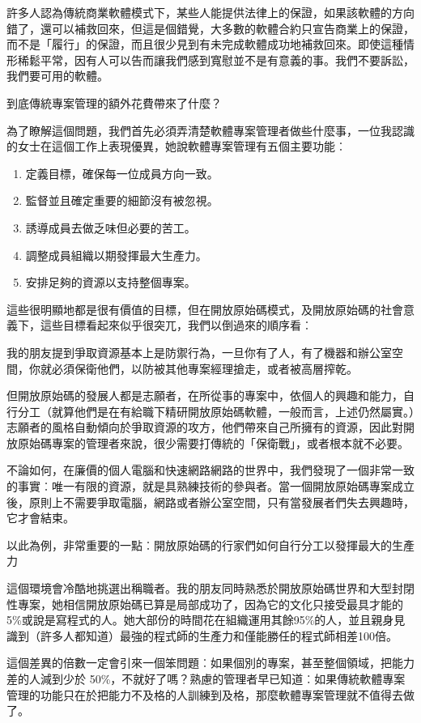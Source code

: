 \documentclass[10pt, b5paper]{book}
\makeatletter
\newcommand*{\shifttext}[2]{%
  \settowidth{\@tempdima}{#2}%
  \makebox[\@tempdima]{\hspace*{#1}#2}%
}
\makeatother
\begin{document}
許多人認為傳統商業軟體模式下，某些人能提供法律上的保證，如果該軟體的方向錯了，還可以補救回來，但這是個錯覺，大多數的軟體合約只宣告商業上的保證，而不是「履行」的保證，而且很少見到有未完成軟體成功地補救回來。即使這種情形稀鬆平常，因有人可以告而讓我們感到寬慰並不是有意義的事。我們不要訴訟，我們要可用的軟體。

到底傳統專案管理的額外花費帶來了什麼？

為了瞭解這個問題，我們首先必須弄清楚軟體專案管理者做些什麼事，一位我認識的女士在這個工作上表現優異，她說軟體專案管理有五個主要功能︰

\begin{enumerate}
\item
  定義目標，確保每一位成員方向一致。
\item
  監督並且確定重要的細節沒有被忽視。
\item
  誘導成員去做乏味但必要的苦工。
\item
  調整成員組織以期發揮最大生產力。
\item
  安排足夠的資源以支持整個專案。
\end{enumerate}

這些很明顯地都是很有價值的目標，但在開放原始碼模式，及開放原始碼的社會意義下，這些目標看起來似乎很突兀，我們以倒過來的順序看︰

我的朋友提到爭取資源基本上是防禦行為，一旦你有了人，有了機器和辦公室空間，你就必須保衛他們，以防被其他專案經理搶走，或者被高層搾乾。

但開放原始碼的發展人都是志願者，在所從事的專案中，依個人的興趣和能力，自行分工（就算他們是在有給職下精研開放原始碼軟體，一般而言，上述仍然屬實。）志願者的風格自動傾向於爭取資源的攻方，他們帶來自己所擁有的資源，因此對開放原始碼專案的管理者來說，很少需要打傳統的「保衛戰」，或者根本就不必要。

不論如何，在廉價的個人電腦和快速網路網路的世界中，我們發現了一個非常一致的事實︰唯一有限的資源，就是具熟練技術的參與者。當一個開放原始碼專案成立後，原則上不需要爭取電腦，網路或者辦公室空間，只有當發展者們失去興趣時，它才會結束。

以此為例，非常重要的一點︰開放原始碼的行家們如何自行分工以發揮最大的生產力
\shifttext{1pt}{---}\shifttext{-1pt}{---}
這個環境會冷酷地挑選出稱職者。我的朋友同時熟悉於開放原始碼世界和大型封閉性專案，她相信開放原始碼已算是局部成功了，因為它的文化只接受最具才能的5\%或說是寫程式的人。她大部份的時間花在組織運用其餘95\%的人，並且親身見識到（許多人都知道）最強的程式師的生產力和僅能勝任的程式師相差100倍。

這個差異的倍數一定會引來一個笨問題︰如果個別的專案，甚至整個領域，把能力差的人減到少於
50\%，不就好了嗎？熟慮的管理者早已知道︰如果傳統軟體專案管理的功能只在於把能力不及格的人訓練到及格，那麼軟體專案管理就不值得去做了。
\end{document}
